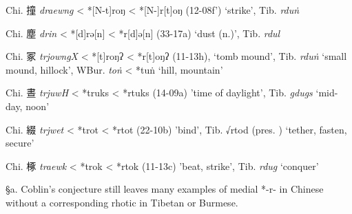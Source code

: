 \begin{description} \item
Chi. 撞 \emph{draewng} \textless{} *[N-t]{}roŋ \textless{}
*[N-]r{[}t]{}oŋ (12-08f') `strike', Tib. {} \emph{rduṅ}
\item
Chi. 塵 \emph{drin} \textless{} *[d]rə[n] \textless{}
*r{[}d]ə[n] (33-17a) `dust (n.)', Tib. {} \emph{rdul}
\item
Chi. 冢 \emph{trjowngX} \textless{} *[t]roŋʔ \textless{}
*r{[}t]oŋʔ (11-13h), `tomb mound', Tib. {} \emph{rduṅ} `small
mound, hillock', WBur. {} \emph{toṅ} \textless{} *tuṅ `hill,
mountain'
\item
Chi. 晝 \emph{trjuwH} \textless{} *truks \textless{} *rtuks (14-09a)
'time of daylight', Tib. {} \emph{gdugs} `mid-day, noon'
\item
Chi. 綴 \emph{trjwet} \textless{} *trot \textless{} *rtot (22-10b)
'bind', Tib. √rtod (pres. {}) `tether, fasten, secure'
\item
Chi. 椓 \emph{traewk} \textless{} *tr{}ok \textless{} *rt{}ok (11-13c)
'beat, strike', Tib. {} \emph{rdug} `conquer'
\end{description}

§a. Coblin's conjecture still leaves many examples of medial *-r- in
Chinese without a corresponding rhotic in Tibetan or Burmese.

